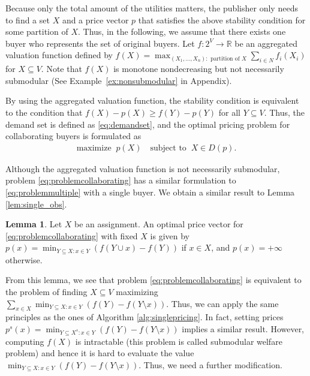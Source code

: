 \documentclass[letterpaper]{article}
\theoremstyle{definition}
\newtheorem{lemma}[theorem]{Lemma}
\begin{document}
%
Because only the total amount of the utilities matters, the publisher only needs to find a set $X$ and a price vector $p$ that satisfies the above stability condition for some partition of $X$.
Thus, in the following, we assume that there exists one buyer who
represents the set of original buyers.
Let $f: 2^V \to \mathbb{R}$ be an aggregated valuation function defined by
$f(X) = \max_{(X_1,\dots,X_n):\text{ partition of } X}  \sum_{i\in N}f_i(X_i)$
for $X \subseteq V$.
Note that $f(X)$ is monotone nondecreasing but not necessarily submodular %
(See Example~\ref{ex:nonsubmodular} in Appendix).


By using the aggregated valuation function,
the stability condition is equivalent to the condition that $ f(X) - p(X) \ge f(Y) - p(Y)$
for all $Y \subseteq V$.
Thus, the demand set is defined as \eqref{eq:demandset}, and the optimal pricing problem for collaborating buyers is formulated as
\begin{align}
  \label{eq:problemcollaborating}
    \text{maximize} \; \; p(X) \quad
    \text{subject to} \; \; X \in D(p).
\end{align}

Although the aggregated valuation function
is not necessarily submodular, problem \eqref{eq:problemcollaborating} has a similar formulation to \eqref{eq:problemmultiple} with a single buyer.
We obtain a similar result to Lemma \ref{lem:single_obs}.
\begin{lemma}\label{lem:collaborating_obs}
Let $X$ be an assignment.
An optimal price vector for \eqref{eq:problemcollaborating} with fixed $X$ is given by
$p(x) =  \min_{Y\subseteq X: x\in Y}(f(Y\cup x) - f(Y))$ if $x \in X$, and $p(x) = +\infty$ otherwise.
\end{lemma}

From this lemma, we see that problem \eqref{eq:problemcollaborating} is equivalent to the problem of finding $X \subseteq V$ maximizing $\sum_{x \in X} \min_{Y\subseteq X: x\in Y}(f(Y) - f(Y \setminus x))$.
Thus, we can apply the same principles as the ones of Algorithm \ref{alg:singlepricing}.
In fact, setting prices $p^s(x)=\min_{Y\subseteq X^s: x\in Y}(f(Y)-f(Y\setminus x))$ implies a similar result.
However, computing $f(X)$ is intractable (this problem is called submodular welfare problem)
and hence
it is hard to evaluate the value \(\min_{Y\subseteq X: x\in Y}(f(Y)-f(Y\setminus x))\).
Thus, we need a further modification.
\end{document}
